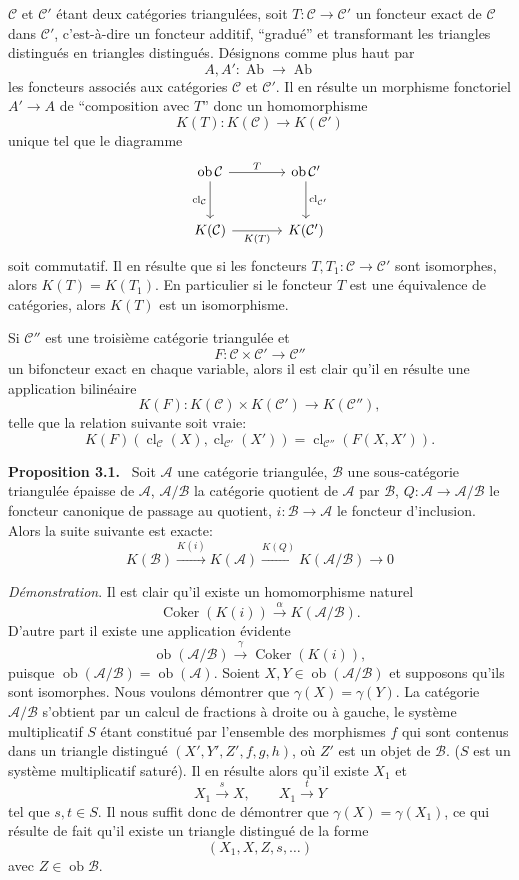 \documentclass[11pt]{article}
\newenvironment{statement}[1]{\par\medskip\noindent\textbf{#1.}\ }{\par\medskip}
\providecommand{\Ob}{\operatorname{ob}}
\providecommand{\cC}{\mathcal C}
\providecommand{\Ob}{\operatorname{ob}}
\providecommand{\Ab}{\operatorname{Ab}}
\providecommand{\cC}{\mathcal C}
\providecommand{\cA}{\mathcal A}
\providecommand{\cB}{\mathcal B}
\providecommand{\Ab}{\operatorname{Ab}}
\providecommand{\Ob}{\operatorname{Ob}}
\providecommand{\Ob}{\operatorname{ob}}
\providecommand{\Ob}{\operatorname{Ob}}
\begin{document}
$\cC$ et $\cC'$ étant deux catégories triangulées, soit $T:\cC\to\cC'$ un foncteur exact de $\cC$ dans $\cC'$, c'est-à-dire un foncteur additif, ``gradué'' et transformant les triangles
distingués en triangles distingués. Désignons comme plus haut par
\[
A,A':\Ab\longrightarrow\Ab
\]
les foncteurs associés aux catégories $\cC$ et $\cC'$. Il en résulte un morphisme fonctoriel $A'\to A$ de ``composition avec $T$'' donc un homomorphisme
\[
K(T):K(\cC)\longrightarrow K(\cC')
\]
unique tel que le diagramme
\[
\begin{tikzcd}[column sep=large,row sep=large]
\Ob\cC \arrow[r,"T"] \arrow[d,"\operatorname{cl}_{\cC}"']&
\Ob\cC' \arrow[d,"\operatorname{cl}_{\cC'}"]\\
K(\cC) \arrow[r,"K(T)"']& K(\cC')
\end{tikzcd}
\]
soit commutatif. Il en résulte que si les foncteurs $T,T_1:\cC\to\cC'$ sont isomorphes, alors $K(T)=K(T_1)$. En particulier si le foncteur $T$ est une équivalence de catégories, alors $K(T)$ est un isomorphisme.

Si $\cC''$ est une troisième catégorie triangulée et
\[
F:\cC\times\cC'\longrightarrow \cC''
\]
un bifoncteur exact en chaque variable, alors il est clair qu'il en résulte une application bilinéaire
\[
K(F):K(\cC)\times K(\cC')\longrightarrow K(\cC''),
\]
telle que la relation suivante soit vraie:
\[
K(F)(\operatorname{cl}_{\cC}(X),\operatorname{cl}_{\cC'}(X'))
=
\operatorname{cl}_{\cC''}(F(X,X')).
\]

\begin{statement}{Proposition 3.1}
Soit $\cA$ une catégorie triangulée, $\cB$ une sous-catégorie triangulée épaisse de $\cA$, $\cA/\cB$ la catégorie quotient de $\cA$ par $\cB$, $Q:\cA\to\cA/\cB$ le foncteur canonique de passage au quotient, $i:\cB\to\cA$ le foncteur d'inclusion. Alors la suite suivante est exacte:
\[
K(\cB)\xrightarrow{K(i)}K(\cA)\xrightarrow{K(Q)}K(\cA/\cB)\longrightarrow 0
\]
\end{statement}

\emph{Démonstration}. Il est clair qu'il existe un homomorphisme naturel
\[
\operatorname{Coker}(K(i))\xrightarrow{\alpha}K(\cA/\cB).
\]
D'autre part il existe une application évidente
\[
\Ob(\cA/\cB)\xrightarrow{\gamma}\operatorname{Coker}(K(i)),
\]
puisque $\Ob(\cA/\cB)=\Ob(\cA)$. Soient $X,Y\in\Ob(\cA/\cB)$ et supposons qu'ils sont isomorphes. Nous voulons démontrer que $\gamma(X)=\gamma(Y)$. La catégorie $\cA/\cB$ s'obtient par un calcul de fractions à droite ou à gauche, le système multiplicatif $S$ étant constitué par l'ensemble des morphismes $f$ qui sont contenus dans un triangle distingué $(X',Y',Z',f,g,h)$, où $Z'$ est un objet de $\cB$. ($S$ est un système multiplicatif saturé). Il en résulte alors qu'il existe $X_1$ et
\[
X_1\xrightarrow{s}X,\qquad X_1\xrightarrow{t}Y
\]
tel que $s,t\in S$. Il nous suffit donc de démontrer que $\gamma(X)=\gamma(X_1)$, ce qui résulte de fait qu'il existe un triangle distingué de la forme
\[
(X_1,X,Z,s,\ldots)
\]
avec $Z\in\Ob\cB$.
\end{document}
